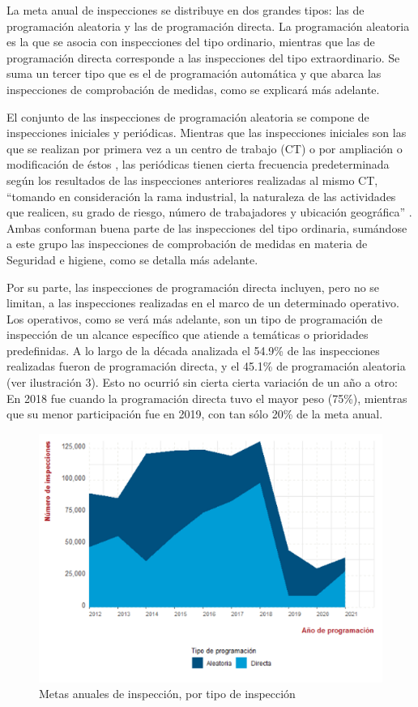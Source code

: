 \documentclass[
]{article}
\begin{document}
La meta anual de inspecciones se distribuye en dos grandes tipos: las de programación aleatoria y las de programación directa. La programación aleatoria es la que se asocia con inspecciones del tipo ordinario, mientras que las de programación directa corresponde a las inspecciones del tipo extraordinario. Se suma un tercer tipo que es el de programación automática y que abarca las inspecciones de comprobación de medidas, como se explicará más adelante.

El conjunto de las inspecciones de programación aleatoria se compone de inspecciones iniciales y periódicas. Mientras que las inspecciones iniciales son las que se realizan por primera vez a un centro de trabajo (CT) o por ampliación o modificación de éstos , las periódicas tienen cierta frecuencia predeterminada según los resultados de las inspecciones anteriores realizadas al mismo CT, ``tomando en consideración la rama industrial, la naturaleza de las actividades que realicen, su grado de riesgo, número de trabajadores y ubicación geográfica'' . Ambas conforman buena parte de las inspecciones del tipo ordinaria, sumándose a este grupo las inspecciones de comprobación de medidas en materia de Seguridad e higiene, como se detalla más adelante.

Por su parte, las inspecciones de programación directa incluyen, pero no se limitan, a las inspecciones realizadas en el marco de un determinado operativo. Los operativos, como se verá más adelante, son un tipo de programación de inspección de un alcance específico que atiende a temáticas o prioridades predefinidas.
A lo largo de la década analizada el 54.9\% de las inspecciones realizadas fueron de programación directa, y el 45.1\% de programación aleatoria (ver ilustración 3). Esto no ocurrió sin cierta cierta variación de un año a otro: En 2018 fue cuando la programación directa tuvo el mayor peso (75\%), mientras que su menor participación fue en 2019, con tan sólo 20\% de la meta anual.

\begin{figure}
\includegraphics[width=7.33in]{images-1/08/Metasanualesinspeccion} \caption{Metas anuales de inspección, por tipo de inspección}\label{fig:Metasanualesinspeccion}
\end{figure}
\end{document}
